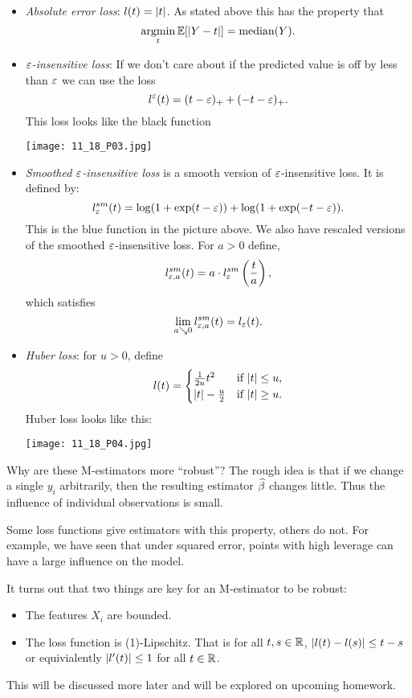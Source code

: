 \begin{itemize}
    \item \emph{Absolute error loss}: $l(t)={\left\lvert t\right\rvert}$. As stated above this has the property that \[\operatorname*{argmin}_t {\mathbb{E}}[{\left\lvert Y-t\right\rvert}]=\text{median}(Y).\]
    \item \emph{$\varepsilon$-insensitive loss}: If we don't care about if the predicted value is off by less than $\varepsilon$ we can use the loss\[ l^\varepsilon(t) = (t-\varepsilon)_++(-t-\varepsilon)_+.\] This loss looks like the black function
    \begin{center}
        \texttt{[image: 11\_18\_P03.jpg]}
    \end{center}
    \item \emph{Smoothed $\varepsilon$-insensitive loss} is a smooth version of $\varepsilon$-insensitive loss. It is defined by:
    \[l_\varepsilon^{sm}(t) = \log(1+\exp(t-\varepsilon))+\log(1+\exp(-t-\varepsilon)).\]
    This is the blue function in the picture above. We also have rescaled versions of the smoothed $\varepsilon$-insensitive loss. For $a > 0$ define, 
    \[l^{sm}_{\varepsilon,a}(t) = a \cdot l_\varepsilon^{sm}\left(\frac{t}{a}\right),\]
    which satisfies \[\lim_{a \searrow 0} l_{\varepsilon,a}^{sm}(t)=l_\varepsilon(t).\]
    \item \emph{Huber loss}: for $u > 0$, define
    \[l(t) = \begin{cases}
        \frac{1}{2u} t^2 & \text{if } {\left\lvert t\right\rvert} \le u,\\
        {\left\lvert t\right\rvert}-\frac{u}{2} & \text{if } {\left\lvert t\right\rvert} \ge u.
    \end{cases} \]
    Huber loss looks like this:
    \begin{center}
        \texttt{[image: 11\_18\_P04.jpg]}
    \end{center}
\end{itemize}
Why are these M-estimators more ``robust''? The rough idea is that if we change a single $y_i$ arbitrarily, then the resulting estimator $\widehat{\beta}$ changes little. Thus the influence of individual observations is small.

Some loss functions give estimators with this property, others do not. For example, we have seen that under squared error, points with high leverage can have a large influence on the model. 

It turns out that two things are key for an M-estimator to be robust:
\begin{itemize}
    \item The features $X_i$ are bounded.
    \item The loss function is (1)-Lipschitz. That is for all $t,s \in {\mathbb R}$, ${\left\lvert l(t)-l(s)\right\rvert}\le {t-s}$ or equivialently ${\left\lvert l'(t)\right\rvert}\le 1$ for all $t\in {\mathbb R}$.
\end{itemize}
This will be discussed more later and will be explored on upcoming homework.
